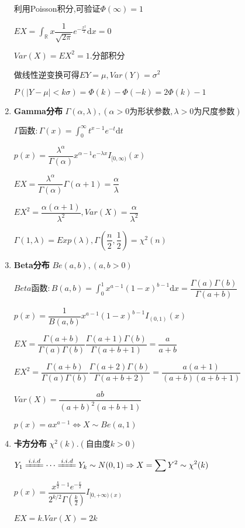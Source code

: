 \begin{enumerate}
	利用Poisson积分,可验证$\Phi(\infty) = 1$

  $EX = \int_{\mathbb{R}}{x\dfrac{1}{\sqrt{2\pi}}e^{-\frac{x^2}{2}}\mathrm{d}x} = 0$

	$ Var(X) = EX^2 = 1. 分部积分$

	做线性逆变换可得$EY = \mu, Var(Y) = \sigma^2$

	$ P(|Y-\mu| < k\sigma) = \Phi(k) - \Phi(-k) = 2\Phi(k)-1$

\item \textbf{Gamma分布} $\Gamma(\alpha, \lambda),(\alpha > 0为形状参数,\lambda>0为尺度参数)$

    $ \Gamma 函数: \Gamma(x) = \int_{0}^{\infty}t^{x-1}e^{-t}\mathrm{d}t$

	$ p(x) = \dfrac{\lambda^{\alpha}}{\Gamma(\alpha)}x^{\alpha - 1}e^{-\lambda x}I_{[0,\infty)}(x)$

	$ EX = \dfrac{\lambda^{\alpha}}{\Gamma(\alpha)}\Gamma(\alpha+1) = \dfrac{\alpha}{\lambda}$

	$ EX^2 = \dfrac{\alpha(\alpha+1)}{\lambda^2},Var(X) = \dfrac{\alpha}{\lambda^2}$

	$ \Gamma(1,\lambda )= Exp(\lambda), \Gamma(\dfrac{n}{2},\dfrac{1}{2}) = \chi ^2(n)$
  \item \textbf{Beta分布} $ Be(a,b),(a,b>0)$

    $ Beta函数:B(a,b) = \int_{0}^{1}{x^{a-1}(1-x)^{b-1}\mathrm{d}x} = \dfrac{\Gamma(a)\Gamma(b)}{\Gamma(a+b)}$

  $ p(x) = \dfrac{1}{B(a,b)}x^{a-1}(1-x)^{b-1}I_{(0,1)}(x)$

    $ EX = \dfrac{\Gamma(a+b)}{\Gamma(a)\Gamma(b)}\dfrac{\Gamma(a+1)\Gamma(b)}{\Gamma(a+b+1)} = \dfrac{a}{a+b}$

    $ EX^2 = \dfrac{\Gamma(a+b)}{\Gamma(a)\Gamma(b)}\dfrac{\Gamma(a+2)\Gamma(b)}{\Gamma(a+b+2)} = \dfrac{a(a+1)}{(a+b)(a+b+1)}$

    $ Var(X) = \dfrac{ab}{(a+b)^2(a+b+1)}$

    $ p(x)=ax^{a-1}\Leftrightarrow X\sim Be(a,1)$

  \item \textbf{卡方分布} $ \chi^2(k).(自由度k>0)$

    $ Y_1 \xlongequal{i.i.d} \cdots \xlongequal{i.i.d} Y_k \sim N(0,1)
    \Rightarrow X = \sum{Y^2}\sim \chi^2(k)$

  $ p(x) = \dfrac{x^{\frac{k}{2}-1}e^{-\frac{x}{2}}}{2^{k/2}\Gamma(\frac{k}{2})} I_{[0,+\infty)(x)}$

    $ EX = k. Var(X) = 2k$


\end{enumerate}
